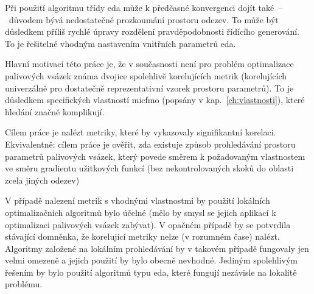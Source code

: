 Při použití algoritmu třídy \ac{eda} může k předčasné konvergenci dojít také~--~důvodem bývá nedostatečné prozkoumání prostoru odezev. To může 
být důsledkem příliš rychlé úpravy rozdělení pravděpodobnosti řídícího generování. To je řešitelné vhodným nastavením vnitřních 
parametrů \ac{eda}. 

Hlavní motivací této práce je, že v současnosti není pro problém optimalizace palivových vsázek známa dvojice spolehlivě 
korelujících metrik (korelujících univerzálně pro dostatečně reprezentativní vzorek prostoru parametrů). To je důsledkem specifických 
vlastností \ac{micfmo} (popsány v kap.~\ref{ch:vlastnosti}), které hledání značně komplikují. 

Cílem práce je nalézt metriky, které by vykazovaly signifikantní korelaci. Ekvivalentně: cílem práce je ověřit, zda existuje způsob 
prohledávání prostoru parametrů palivových vsázek, který povede směrem k požadovaným vlastnostem ve směru gradientu užitkových 
funkcí (bez nekontrolovaných skoků do oblasti zcela jiných odezev) 

V případě nalezení metrik s vhodnými vlastnostmi by použití lokálních optimalizačních algoritmů bylo účelné (mělo by smysl se 
jejich aplikací k optimalizaci palivových vsázek zabývat). V opačném případě by se potvrdila stávající domněnka, že korelující 
metriky nelze (v rozumném čase) nalézt. Algoritmy založené na lokálním prohledávání by v takovém případě fungovaly jen velmi omezeně a jejich použití 
by bylo obecně nevhodné. Jediným spolehlivým řešením by bylo použití algoritmů typu \ac{eda}, které fungují nezávisle na lokalitě 
problému.



